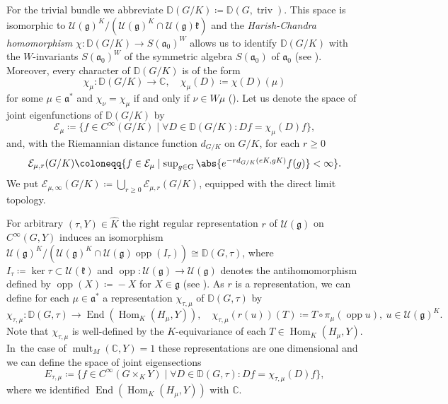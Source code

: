 \documentclass[JEP,XML,SOM,NoFloatCountersInSection,Unicode,published]{cedram}
\theoremstyle{definition}
\DeclarePairedDelimiter{\abs}\lvert\rvert
\newcommand{\mc}[1]{\ensuremath{\mathcal{#1}}}
\newcommand{\mf}[1]{\ensuremath{\mathfrak{#1}}}
\newcommand{\on}[1]{\ensuremath{\operatorname{#1}}}
\newcommand{\Hom}[3]{\ensuremath{\on{Hom}_{#1}(#2,#3)}}
\newcommand{\C}{\ensuremath{\mathbb{C}}}
\newcommand{\ps}[2]{\ensuremath{H_{#2}}}
\begin{document}
For the trivial bundle we abbreviate $\mathbb{D}(G/K)\coloneqq\mathbb{D}(G,\on{triv})$. This space is isomorphic to $\mc U(\mf g)^K/(\mc U(\mf g)^K\cap\mc U(\mf g)\mf k)$ and the \emph{Harish-Chandra homomorphism} \hbox{$\chi:\mathbb{D}(G/K)\to S(\mf a_0)^W$} allows us to identify $\mathbb{D}(G/K)$ with the $W$-invariants $S(\mf a_0)^W$ of the symmetric algebra $S(\mf a_0)$ of $\mf a_0$ (see \cite[Ch.\,II, Th.\,4.3, 4.6, 5.18]{GAGA}). Moreover, every character of $\mathbb{D}(G/K)$ is of the form\vspace*{-3pt}
\[
\chi_\mu\colon\mathbb{D}(G/K)\to\C,\quad\chi_\mu(D)\coloneqq\chi(D)(\mu)
\]
for some $\mu\in\mf a^*$ and $\chi_\nu=\chi_\mu$ if and only if $\nu\in W\mu$ (\cf \cite[Ch.\,III, Lem.\,3.11]{GAGA}). Let us denote the space of joint eigenfunctions of $\mathbb{D}(G/K)$ by\vspace*{-3pt}
\[
\mc E_\mu\coloneqq\{f\in C^\infty(G/K)\mid \forall D\in\mathbb{D}(G/K)\colon Df=\chi_\mu(D)f\},
\]
and, with the Riemannian distance function $d_{G/K}$ on $G/K$, for each $r\geq0$
\begin{equation}\label{eq:E_distr}\textstyle
\mc E_{\mu,r}(G/K)\coloneqq\{f\in\mc E_\mu\mid\sup_{g\in G}\abs{e^{-rd_{G/K}(eK,gK)}f(g)}<\infty\}.
\end{equation}
We put $\mc E_{\mu,\infty}(G/K)\coloneqq\bigcup_{r\geq0}\mc E_{\mu,r}(G/K)$, equipped with the direct limit topology.

For arbitrary $(\tau,Y)\in\hat K$ the right regular representation $r$ of $\mc U(\mf g)$ on $C^\infty(G,Y)$ induces an isomorphism $\mc U(\mf g)^K/(\mc U(\mf g)^K\cap\mc U(\mf g)\on{opp}(I_{\tau}))\cong\mathbb{D}(G,\tau)$, where $I_\tau\coloneqq\ker\tau\subset\mc U(\mf k)$ and $\on{opp}:\mc U(\mf g)\to\mc U(\mf g)$ denotes the antihomomorphism defined by \hbox{$\on{opp}(X)\!\coloneqq\! -X$} for $X\in\mf g$ (see {\cite[Th.\,1.3]{Min92}}). As $r$ is a representation, we can define for each $\mu\in\mf a^*$ a representation $\chi_{\tau,\mu}$ of $\mathbb{D}(G,\tau)$ by\vspace*{-3pt}
\[
\chi_{\tau,\mu}\colon\mathbb{D}(G,\tau)\to\on{End}(\Hom{K}{\ps{\sigma}{\mu}}{Y}),\quad\chi_{\tau,\mu}(r(u))(T)\coloneqq T\circ\pi_{\mu}(\on{opp}u),\ u\in\mc U(\mf g)^K.
\]
Note that $\chi_{\tau,\mu}$ is well-defined by the $K$-equivariance of each $T\in\Hom{K}{\ps{\sigma}{\mu}}{Y}$.
In~the case of $\on{mult}_M(\C,Y)=1$ these representations are one dimensional and we can define the space of joint eigensections\vspace*{-3pt}
\[
E_{\tau,\mu}\coloneqq\{f\in C^\infty(G\times_KY)\mid\forall D\in\mathbb{D}(G,\tau)\colon Df=\chi_{\tau,\mu}(D)f\},
\]
where we identified $\on{End}(\Hom{K}{\ps{\sigma}{\mu}}{Y})$ with $\C$.
\end{document}
